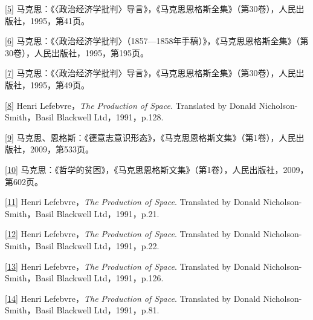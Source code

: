 \documentclass[UTF8, fontset = sourcesans, a4paper, oneside, zihao =
-4, scheme=chinese, no-math, space=true]{ctexbook}
\begin{document}
\protect\hypertarget{part0007_split_004.htmlux5cux23m5}{}{}\protect\hyperlink{part0007_split_001.htmlux5cux23w5}{{[}5{]}}
马克思：《〈政治经济学批判〉导言》，《马克思恩格斯全集》（第30卷），人民出版社，1995，第41页。

\protect\hypertarget{part0007_split_004.htmlux5cux23m6}{}{}\protect\hyperlink{part0007_split_001.htmlux5cux23w6}{{[}6{]}}
马克思：《〈政治经济学批判〉（1857---1858年手稿）》，《马克思恩格斯全集》（第30卷），人民出版社，1995，第195页。

\protect\hypertarget{part0007_split_004.htmlux5cux23m7}{}{}\protect\hyperlink{part0007_split_001.htmlux5cux23w7}{{[}7{]}}
马克思：《〈政治经济学批判〉导言》，《马克思恩格斯全集》（第30卷），人民出版社，1995，第49页。

\protect\hypertarget{part0007_split_004.htmlux5cux23m8}{}{}\protect\hyperlink{part0007_split_001.htmlux5cux23w8}{{[}8{]}}
Henri Lefebvre，\emph{The Production of Space}. Translated by Donald
Nicholson-Smith，Basil Blackwell Ltd，1991，p.128.

\protect\hypertarget{part0007_split_004.htmlux5cux23m9}{}{}\protect\hyperlink{part0007_split_001.htmlux5cux23w9}{{[}9{]}}
马克思、恩格斯：《德意志意识形态》，《马克思恩格斯文集》（第1卷），人民出版社，2009，第533页。

\protect\hypertarget{part0007_split_004.htmlux5cux23m10}{}{}\protect\hyperlink{part0007_split_001.htmlux5cux23w10}{{[}10{]}}
马克思：《哲学的贫困》，《马克思恩格斯文集》（第1卷），人民出版社，2009，第602页。

\protect\hypertarget{part0007_split_004.htmlux5cux23m11}{}{}\protect\hyperlink{part0007_split_001.htmlux5cux23w11}{{[}11{]}}
Henri Lefebvre，\emph{The Production of Space}. Translated by Donald
Nicholson-Smith，Basil Blackwell Ltd，1991，p.21.

\protect\hypertarget{part0007_split_004.htmlux5cux23m12}{}{}\protect\hyperlink{part0007_split_001.htmlux5cux23w12}{{[}12{]}}
Henri Lefebvre，\emph{The Production of Space}. Translated by Donald
Nicholson-Smith，Basil Blackwell Ltd，1991，p.22.

\protect\hypertarget{part0007_split_004.htmlux5cux23m13}{}{}\protect\hyperlink{part0007_split_001.htmlux5cux23w13}{{[}13{]}}
Henri Lefebvre，\emph{The Production of Space}. Translated by Donald
Nicholson-Smith，Basil Blackwell Ltd，1991，p.126.

\protect\hypertarget{part0007_split_004.htmlux5cux23m14}{}{}\protect\hyperlink{part0007_split_001.htmlux5cux23w14}{{[}14{]}}
Henri Lefebvre，\emph{The Production of Space}. Translated by Donald
Nicholson-Smith，Basil Blackwell Ltd，1991，p.81.
\end{document}
